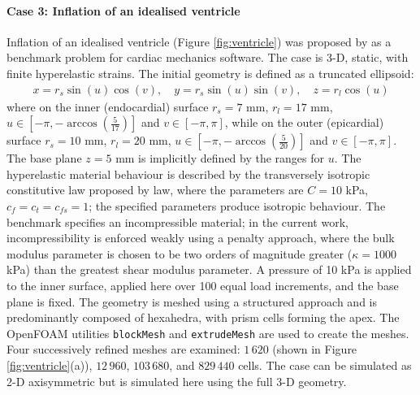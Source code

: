 \documentclass[sn-mathphys,Numbered]{sn-jnl}%
\begin{document}
\paragraph{Case 3: Inflation of an idealised ventricle}
Inflation of an idealised ventricle (Figure \ref{fig:ventricle}) was proposed by \citet{Land2015} as a benchmark problem for cardiac mechanics software.
The case is 3-D, static, with finite hyperelastic strains.
The initial geometry is defined as a truncated ellipsoid:
\begin{eqnarray}
	x = r_s \sin(u) \cos(v), \quad
	y = r_s \sin(u) \sin(v), \quad
	z = r_l \cos(u)
\end{eqnarray}
where on the inner (endocardial) surface $r_s =7$ mm, $r_l = 17$ mm, $u \in \left[-\pi, -\arccos \left( \frac{5}{17} \right) \right]$ and $v \in \left[-\pi, \pi \right]$, while on the outer (epicardial) surface $r_s =10$ mm, $r_l = 20$ mm, $u \in \left[-\pi, -\arccos \left( \frac{5}{20} \right) \right]$ and $v \in \left[-\pi, \pi \right]$.
The base plane $z = 5$ mm is implicitly defined by the ranges for $u$.
The hyperelastic material behaviour is described by the transversely isotropic constitutive law proposed by \citet{Guccione1995} law, where the parameters are $C = 10$ kPa, $c_f = c_t = c_{fs} = 1$; the specified parameters produce isotropic behaviour.
The benchmark specifies an incompressible material; in the current work, incompressibility is enforced weakly using a penalty approach, where the bulk modulus parameter is chosen to be two orders of magnitude greater ($\kappa = 1000$ kPa) than the greatest shear modulus parameter.
A pressure of 10 kPa is applied to the inner surface, applied here over 100 equal load increments, and the base plane is fixed.
The geometry is meshed using a structured approach and is predominantly composed of hexahedra, with prism cells forming the apex.
The OpenFOAM utilities \texttt{blockMesh} and \texttt{extrudeMesh} are used to create the meshes.
Four successively refined meshes are examined: $1\,620$ (shown in Figure \ref{fig:ventricle}(a)), $12\,960$, $103\,680$, and $829\,440$ cells.
The case can be simulated as 2-D axisymmetric but is simulated here using the full 3-D geometry.
\end{document}
